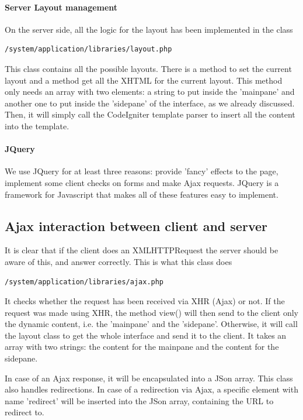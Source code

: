 \documentclass[12pt]{report}
\begin{document}
\paragraph{Server Layout management}
On the server side, all the logic for the layout has been implemented in the class \begin{verbatim}/system/application/libraries/layout.php
\end{verbatim}
This class contains all the possible layouts. There is a method to set the current layout and a method get all the XHTML for the current layout. This method only needs an array with two elements: a string to put inside the 'mainpane' and another one to put inside the 'sidepane' of the interface, as we already discussed. Then, it will simply call the CodeIgniter template parser to insert all the content into the template.

\paragraph{JQuery}
We use JQuery for at least three reasons: provide 'fancy' effects to the page, implement some client checks on forms and make Ajax requests. JQuery is a framework for Javascript that makes all of these features easy to implement.

\subsection{Ajax interaction between client and server}
It is clear that if the client does an XMLHTTPRequest the server should be aware of this, and answer correctly. This is what this class does
\begin{verbatim}/system/application/libraries/ajax.php
\end{verbatim}
It checks whether the request has been received via XHR (Ajax) or not. If the request was made using XHR, the method view() will then send to the client only the dynamic content, i.e. the 'mainpane' and the 'sidepane'. Otherwise, it will call the layout class to get the whole interface and send it to the client. It takes an array with two strings: the content for the mainpane and the content for the sidepane.

In case of an Ajax response, it will be encapsulated into a JSon array. This class also handles redirections. In case of a redirection via Ajax, a specific element with name 'redirect' will be inserted into the JSon array, containing the URL to redirect to.
\end{document}
